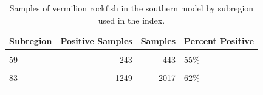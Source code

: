 \documentclass[11pt,
  english,
]{article}
\begin{document}
\begin{table}

\caption{\label{tab:tab-region-crfspr}Samples of vermilion rockfish in the southern model by subregion used in the index.}
\centering
\begin{tabular}[t]{lrrl}
\toprule
Subregion & Positive Samples & Samples & Percent Positive\\
\midrule
\cellcolor{gray!6}{37} & \cellcolor{gray!6}{1515} & \cellcolor{gray!6}{2617} & \cellcolor{gray!6}{58\%}\\
59 & 243 & 443 & 55\%\\
\cellcolor{gray!6}{73} & \cellcolor{gray!6}{1718} & \cellcolor{gray!6}{2904} & \cellcolor{gray!6}{59\%}\\
83 & 1249 & 2017 & 62\%\\
\cellcolor{gray!6}{111} & \cellcolor{gray!6}{2043} & \cellcolor{gray!6}{3972} & \cellcolor{gray!6}{51\%}\\
\bottomrule
\end{tabular}
\end{table}
\end{document}
